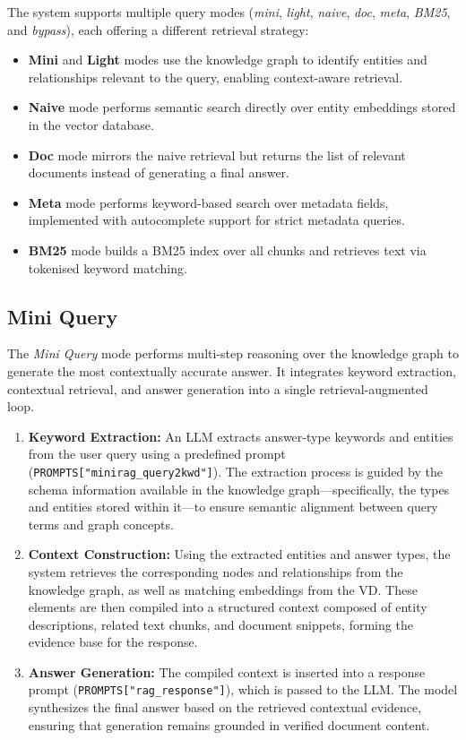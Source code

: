 The system supports multiple query modes (\textit{mini}, \textit{light}, \textit{naive}, \textit{doc}, \textit{meta}, \textit{BM25}, and \textit{bypass}), each offering a different retrieval strategy:
\begin{itemize}
    \item \textbf{Mini} and \textbf{Light} modes use the knowledge graph to identify entities and relationships relevant to the query, enabling context-aware retrieval.
    \item \textbf{Naive} mode performs semantic search directly over entity embeddings stored in the vector database.
    \item \textbf{Doc} mode mirrors the naive retrieval but returns the list of relevant documents instead of generating a final answer.
    \item \textbf{Meta} mode performs keyword-based search over metadata fields, implemented with autocomplete support for strict metadata queries.
    \item \textbf{BM25} mode builds a BM25 index over all chunks and retrieves text via tokenised keyword matching.
\end{itemize}
\subsection{Mini Query}

The \textit{Mini Query} mode performs multi-step reasoning over the knowledge graph to generate the most contextually accurate answer.  
It integrates keyword extraction, contextual retrieval, and answer generation into a single retrieval-augmented loop.

\begin{enumerate}
    \item \textbf{Keyword Extraction:}  
    An \gls{LLM} extracts answer-type keywords and entities from the user query using a predefined prompt (\texttt{PROMPTS["minirag\_query2kwd"]}).
    The extraction process is guided by the schema information available in the knowledge graph—specifically, the types and entities stored within it—to ensure semantic alignment between query terms and graph concepts.
    
    \item \textbf{Context Construction:}  
    Using the extracted entities and answer types, the system retrieves the corresponding nodes and relationships from the knowledge graph, as well as matching embeddings from the \gls{VD}.
    These elements are then compiled into a structured context composed of entity descriptions, related text chunks, and document snippets, forming the evidence base for the response.
    
    \item \textbf{Answer Generation:}  
    The compiled context is inserted into a response prompt (\texttt{PROMPTS["rag\_response"]}), which is passed to the \gls{LLM}.
    The model synthesizes the final answer based on the retrieved contextual evidence, ensuring that generation remains grounded in verified document content.
\end{enumerate}

